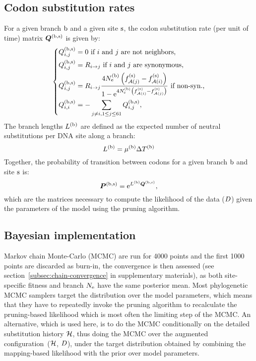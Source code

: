 \subsection{Codon substitution rates}
For a given branch $\text{b}$ and a given site $\text{s}$, the codon substitution rate (per unit of time) matrix $\bm{Q}^{(\text{b}, \text{s})}$ is given by:
\begin{equation}
    \label{eq:subrates}
    \begin{dcases}
        \submatrix\branchsiteexp_{\itoj} = 0\text{ if $\ci$ and $\cj$ are not neighbors,} \\
        \submatrix\branchsiteexp_{\itoj} = \mutmatrix_{\nucitoj}\text{ if $\ci$ and $\cj$ are synonymous,} \\
        \submatrix\branchsiteexp_{\itoj} = \mutmatrix_{\nucitoj} \dfrac{4\Ne\branchexp \left({\fitj\siteexp - \fiti\siteexp}\right)}{{1 - \e^{4\Ne\branchexp\left({\fiti\siteexp - \fitj\siteexp}\right)} }} \text{ if non-syn.,}\\
        \submatrix\branchsiteexp_{\ci, \ci} = - \sum\limits_{ \cj \neq \ci, \jSetCodon} \submatrix\branchsiteexp_{\itoj},
    \end{dcases}
\end{equation}
The branch lengths $L^{(\text{b})}$ are defined as the expected number of neutral substitutions per \acrshort{DNA} site along a branch:
\begin{equation}
    \label{eq:branchlength}
    \branchlength\branchexp = \mu\branchexp \branchtime\branchexp
\end{equation}
Together, the probability of transition between codons for a given branch $\text{b}$ and site $\text{s}$ is:
\begin{equation}
    \label{eq:Probmatrix}
    \Probmatrix\branchsiteexp = \e^{\branchlength\branchexp \Submatrix\branchsiteexp},
\end{equation}
which are the matrices necessary to compute the likelihood of the data ($D$) given the parameters of the model using the pruning algorithm.

\subsection{Bayesian implementation}
\label{sec:Bayesian}
Markov chain Monte-Carlo (\acrshort{MCMC}) are run for 4000 points and the first 1000 points are discarded as burn-in, the convergence is then assessed (see section~\ref{subsec:chain-convergence} in supplementary materials), as both site-specific fitness and branch $N_{\mathrm{e}}$ have the same posterior mean.
Most phylogenetic \acrshort{MCMC} samplers target the distribution over the model parameters, which means that they have to repeatedly invoke the pruning algorithm to recalculate the pruning-based likelihood which is most often the limiting step of the \acrshort{MCMC}.
An alternative, which is used here, is to do the \acrshort{MCMC} conditionally on the detailed substitution history $\mathcal{H}$, thus doing the \acrshort{MCMC} over the augmented configuration~($\mathcal{H}$, $D$), under the target distribution obtained by combining the mapping-based likelihood with the prior over model parameters.

